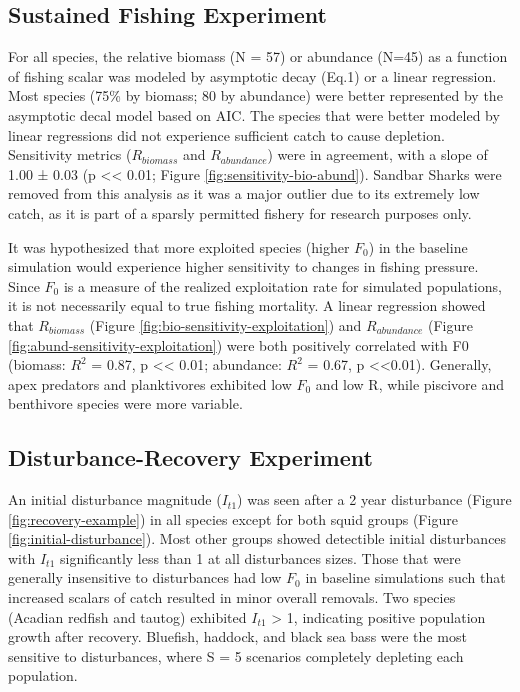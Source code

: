 \documentclass[
]{article}
\begin{document}
\subsection{Sustained Fishing Experiment}\label{sustained-fishing-experiment-1}

For all species, the relative biomass (N = 57) or abundance (N=45) as a function of fishing scalar was modeled by asymptotic decay (Eq.1) or a linear regression. Most species (75\% by biomass; 80 by abundance) were better represented by the asymptotic decal model based on AIC. The species that were better modeled by linear regressions did not experience sufficient catch to cause depletion. Sensitivity metrics (\(R_{biomass}\) and \(R_{abundance}\)) were in agreement, with a slope of 1.00 ± 0.03 (p \textless\textless{} 0.01; Figure \ref{fig:sensitivity-bio-abund}). Sandbar Sharks were removed from this analysis as it was a major outlier due to its extremely low catch, as it is part of a sparsly permitted fishery for research purposes only.

It was hypothesized that more exploited species (higher \(F_0\)) in the baseline simulation would experience higher sensitivity to changes in fishing pressure. Since \(F_0\) is a measure of the realized exploitation rate for simulated populations, it is not necessarily equal to true fishing mortality. A linear regression showed that \(R_{biomass}\) (Figure \ref{fig:bio-sensitivity-exploitation}) and \(R_{abundance}\) (Figure \ref{fig:abund-sensitivity-exploitation}) were both positively correlated with F0 (biomass: \(R^2\) = 0.87, p \textless\textless{} 0.01; abundance: \(R^2\) = 0.67, p \textless\textless0.01). Generally, apex predators and planktivores exhibited low \(F_0\) and low R, while piscivore and benthivore species were more variable.

\subsection{Disturbance-Recovery Experiment}\label{disturbance-recovery-experiment-1}

An initial disturbance magnitude (\(I_{t1}\)) was seen after a 2 year disturbance (Figure \ref{fig:recovery-example}) in all species except for both squid groups (Figure \ref{fig:initial-disturbance}). Most other groups showed detectible initial disturbances with \(I_{t1}\) significantly less than 1 at all disturbances sizes. Those that were generally insensitive to disturbances had low \(F_0\) in baseline simulations such that increased scalars of catch resulted in minor overall removals. Two species (Acadian redfish and tautog) exhibited \(I_{t1}\) \textgreater{} 1, indicating positive population growth after recovery. Bluefish, haddock, and black sea bass were the most sensitive to disturbances, where S = 5 scenarios completely depleting each population.
\end{document}
